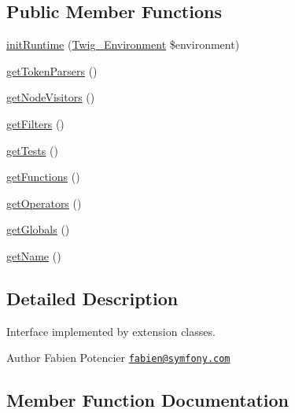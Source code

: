 \subsection*{Public Member Functions}
\begin{DoxyCompactItemize}
\item 
\hyperlink{interfaceTwig__ExtensionInterface_a9ce76d2e0412fb7c4bafa77e9b9ce44d}{init\+Runtime} (\hyperlink{classTwig__Environment}{Twig\+\_\+\+Environment} \$environment)
\item 
\hyperlink{interfaceTwig__ExtensionInterface_a37669c17957e93e015a269d9caf8422b}{get\+Token\+Parsers} ()
\item 
\hyperlink{interfaceTwig__ExtensionInterface_a9732c3be4b3440d56816b7a915e4a65e}{get\+Node\+Visitors} ()
\item 
\hyperlink{interfaceTwig__ExtensionInterface_a265b27c09bbaa487ffbca950758f90c5}{get\+Filters} ()
\item 
\hyperlink{interfaceTwig__ExtensionInterface_a7e0721439822a7bcdd78de4342e50b3e}{get\+Tests} ()
\item 
\hyperlink{interfaceTwig__ExtensionInterface_a50581123d58d227efc982bb0d3575215}{get\+Functions} ()
\item 
\hyperlink{interfaceTwig__ExtensionInterface_a4b15620449e62fda2081cf480bb5e4cf}{get\+Operators} ()
\item 
\hyperlink{interfaceTwig__ExtensionInterface_af9ed562412969b31cd66ce77b97c5ab7}{get\+Globals} ()
\item 
\hyperlink{interfaceTwig__ExtensionInterface_acda2173b9c2dd519712430f28c4b0b3f}{get\+Name} ()
\end{DoxyCompactItemize}


\subsection{Detailed Description}
Interface implemented by extension classes.

\begin{DoxyAuthor}{Author}
Fabien Potencier \href{mailto:fabien@symfony.com}{\tt fabien@symfony.\+com} 
\end{DoxyAuthor}


\subsection{Member Function Documentation}
